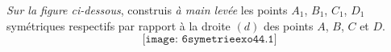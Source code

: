 {\em Sur la figure ci-dessous}, construis {\em à main levée} les
points $A_1$, $B_1$, $C_1$, $D_1$ symétriques respectifs par rapport à
la droite $(d)$ des points $A$, $B$, $C$ et $D$.
\[\texttt{[image: 6symetrieexo44.1]}\]